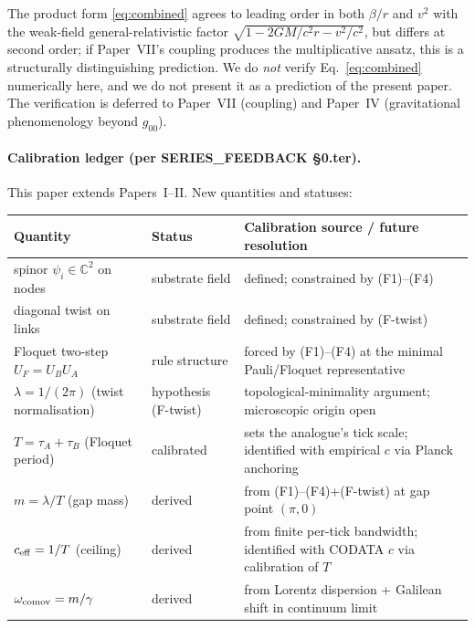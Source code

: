 \documentclass[11pt,a4paper]{article}
\begin{document}
The product form \eqref{eq:combined} agrees to leading order in
both $\beta/r$ and $v^2$ with the weak-field
general-relativistic factor $\sqrt{1 - 2GM/c^2 r - v^2/c^2}$,
but differs at second order; if Paper~VII's coupling produces
the multiplicative ansatz, this is a structurally
distinguishing prediction. We do \emph{not} verify
Eq.~\eqref{eq:combined} numerically here, and we do not present
it as a prediction of the present paper. The verification is
deferred to Paper~VII (coupling) and Paper~IV (gravitational
phenomenology beyond $g_{00}$).

\paragraph{Calibration ledger (per SERIES\_FEEDBACK §0.ter).}
This paper extends Papers~I--II. New quantities and statuses:

\begin{center}
\begin{tabular}{p{3.4cm}p{3.0cm}p{6.6cm}}
\toprule
Quantity & Status & Calibration source / future resolution \\
\midrule
spinor $\psi_i \in \mathbb{C}^2$ on nodes & substrate field & defined; constrained by (F1)--(F4) \\
diagonal twist on links & substrate field & defined; constrained by (F-twist) \\
Floquet two-step $U_F = U_B U_A$ & rule structure & forced by (F1)--(F4) at the minimal Pauli/Floquet representative \\
$\lambda = 1/(2\pi)$ (twist normalisation) & hypothesis (F-twist) & topological-minimality argument; microscopic origin open \\
$T = \tau_A + \tau_B$ (Floquet period) & calibrated & sets the analogue's tick scale; identified with empirical $c$ via Planck anchoring \\
$m = \lambda/T$ (gap mass) & derived & from (F1)--(F4)+(F-twist) at gap point $(\pi, 0)$ \\
$c_{\rm eff} = 1/T$ (ceiling) & derived & from finite per-tick bandwidth; identified with CODATA $c$ via calibration of $T$ \\
$\omega_{\rm comov} = m/\gamma$ & derived & from Lorentz dispersion + Galilean shift in continuum limit \\
\bottomrule
\end{tabular}
\end{center}
\end{document}
